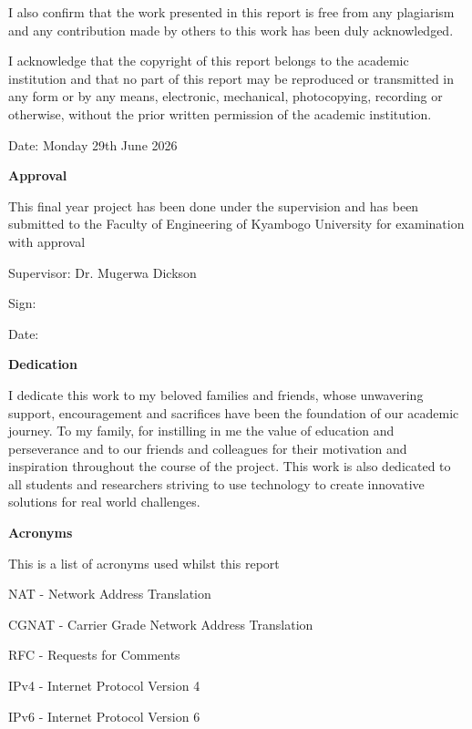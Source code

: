 \documentclass[12pt,a4paper,oneside]{report}
\begin{document}
I also confirm that the work presented in this report is free from any plagiarism and any contribution made by others to this work has been duly acknowledged.


I acknowledge that the copyright of this report belongs to the academic institution and that no part of this report may be reproduced or transmitted in any form or by any means, electronic, mechanical, photocopying, recording or otherwise, without the prior written permission of the academic institution.








Date: Monday 29th June 2026


\clearpage



\textbf{Approval}


This final year project has been done under the supervision and has been submitted to the Faculty of Engineering of Kyambogo University for examination with approval


Supervisor: Dr. Mugerwa Dickson




Sign:




Date:


\clearpage



\textbf{Dedication}


I dedicate this work to my beloved families and friends, whose unwavering support, encouragement and sacrifices have been the foundation of our academic journey. To my family, for instilling in me the value of education and perseverance and to our friends and colleagues for their motivation and inspiration throughout the course of the project. This work is also dedicated to all students and researchers striving to use technology to create innovative solutions for real world challenges.


\clearpage

\textbf{Acronyms}


This is a list of acronyms used whilst this report


NAT  - Network Address Translation


CGNAT - Carrier Grade Network Address Translation


RFC  - Requests for Comments


IPv4  - Internet Protocol Version 4


IPv6  - Internet Protocol Version 6
\end{document}
